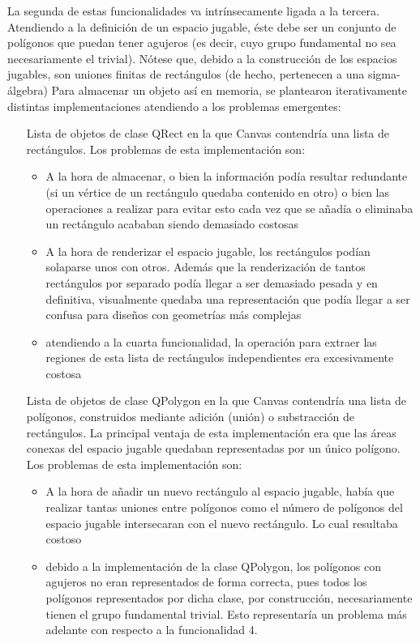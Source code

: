 La segunda de estas funcionalidades va intrínsecamente ligada a la tercera.
Atendiendo a la definición de un espacio jugable, éste debe ser un conjunto de polígonos que puedan tener agujeros (es decir, cuyo grupo fundamental no sea necesariamente el trivial). Nótese que, debido a la construcción de los espacios jugables, son uniones finitas de rectángulos (de hecho, pertenecen a una sigma-álgebra)
Para almacenar un objeto así en memoria, se plantearon iterativamente distintas implementaciones atendiendo a los problemas emergentes:
\begin{enumerate}
	\item[Lista de objetos de clase QRect] en la que Canvas contendría una lista de rectángulos. Los problemas de esta implementación son:
	\begin{itemize}
		\item A la hora de almacenar, o bien la información podía resultar redundante (si un vértice de un rectángulo quedaba contenido en otro) o bien las operaciones a realizar para evitar esto cada vez que se añadía o eliminaba un rectángulo acababan siendo demasiado costosas
		\item A la hora de renderizar el espacio jugable, los rectángulos podían solaparse unos con otros. Además que la renderización de tantos rectángulos por separado podía llegar a ser demasiado pesada y en definitiva, visualmente quedaba una representación que podía llegar a ser confusa para diseños con geometrías más complejas
		\item atendiendo a la cuarta funcionalidad, la operación para extraer las regiones de esta lista de rectángulos independientes era excesivamente costosa
	\end{itemize}
	\item[Lista de objetos de clase QPolygon] en la que Canvas contendría una lista de polígonos, construidos mediante adición (unión) o substracción de rectángulos. La principal ventaja de esta implementación era que las áreas conexas del espacio jugable quedaban representadas por un único polígono. Los problemas de esta implementación son:
	\begin{itemize}
		\item A la hora de añadir un nuevo rectángulo al espacio jugable, había que realizar tantas uniones entre polígonos como el número de polígonos del espacio jugable intersecaran con el nuevo rectángulo. Lo cual resultaba costoso
		\item debido a la implementación de la clase QPolygon, los polígonos con agujeros no eran representados de forma correcta, pues todos los polígonos representados por dicha clase, por construcción, necesariamente tienen el grupo fundamental trivial. Esto representaría un problema más adelante con respecto a la funcionalidad 4.

\end{itemize}
\end{enumerate}
